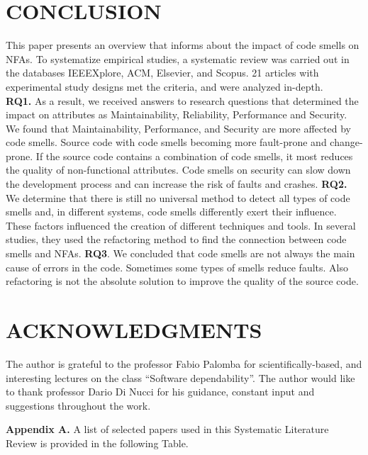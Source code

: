 \documentclass{sigchi}
\begin{document}
\section{CONCLUSION}
This paper presents an overview that informs about the impact of code smells on NFAs. To systematize empirical studies, a systematic review was carried out in the databases IEEEXplore, ACM, Elsevier, and Scopus. 21 articles with experimental study designs met the criteria, and were analyzed in-depth. \\
\textbf{RQ1.} As a result, we received answers to research questions that determined the impact on attributes as Maintainability, Reliability, Performance and Security. We found that Maintainability, Performance, and Security are more affected by code smells. Source code with code smells becoming more fault-prone and change-prone. If the source code contains a combination of code smells, it most reduces the quality of non-functional attributes. Code smells on security can slow down the development process and can increase the risk of faults and crashes. 
\textbf{RQ2.} We determine that there is still no universal method to detect all types of code smells and, in different systems, code smells differently exert their influence. These factors influenced the creation of different techniques and tools. In several studies, they used the refactoring method to find the connection between code smells and NFAs.   
\textbf{RQ3}. We concluded that code smells are not always the main cause of errors in the code. Sometimes some types of smells reduce faults. Also refactoring is not the absolute solution to improve the quality of the source code.

\section{ACKNOWLEDGMENTS}
The author is grateful to the professor Fabio Palomba for scientifically-based, and interesting lectures on the class “Software dependability”. The author would like to thank professor Dario Di Nucci for his guidance, constant input and suggestions throughout the work. 


\appendix
\textbf{Appendix A.} A list of selected papers used in this Systematic Literature Review is provided in the following Table.
\end{document}
